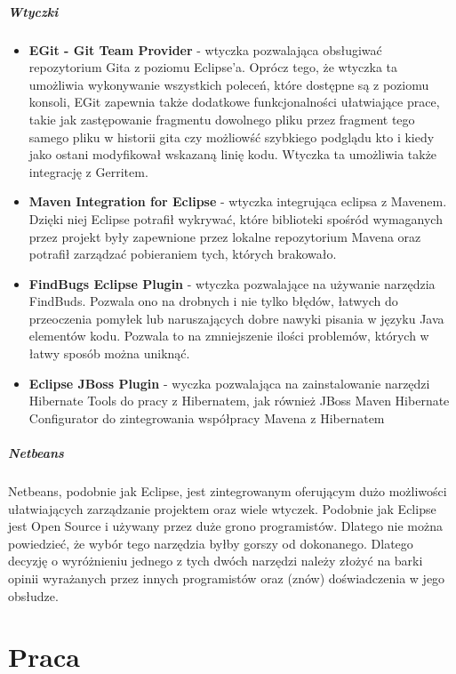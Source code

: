 \documentclass[licencjacka]{pracamgr}
\begin{document}
\paragraph{Wtyczki}
\begin{itemize}
\item \textbf{EGit - Git Team Provider} - wtyczka pozwalająca obsługiwać repozytorium Gita z poziomu Eclipse'a. Oprócz tego, że wtyczka ta umożliwia wykonywanie wszystkich poleceń, które dostępne są z poziomu konsoli, EGit zapewnia także dodatkowe funkcjonalności ułatwiające prace, takie jak zastępowanie fragmentu dowolnego pliku przez fragment tego samego pliku w historii gita czy możliowść szybkiego podglądu kto i kiedy jako ostani modyfikował wskazaną linię kodu. Wtyczka ta umożliwia także integrację z Gerritem.
\item \textbf{Maven Integration for Eclipse} - wtyczka integrująca eclipsa z Mavenem. Dzięki niej Eclipse potrafił wykrywać, które biblioteki spośród wymaganych przez projekt były zapewnione przez lokalne repozytorium Mavena oraz potrafił zarządzać pobieraniem tych, których brakowało.
\item \textbf{FindBugs Eclipse Plugin} - wtyczka pozwalające na używanie narzędzia FindBuds. Pozwala ono na drobnych i nie tylko błędów, łatwych do przeoczenia pomyłek lub naruszających dobre nawyki pisania w języku Java elementów kodu. Pozwala to na zmniejszenie ilości problemów, których w łatwy sposób można uniknąć.
\item \textbf{Eclipse JBoss Plugin} - wyczka pozwalająca na zainstalowanie narzędzi Hibernate Tools do pracy z Hibernatem, jak również JBoss Maven Hibernate Configurator do zintegrowania współpracy Mavena z Hibernatem
\end{itemize}

\paragraph{Netbeans}
Netbeans, podobnie jak Eclipse, jest zintegrowanym oferującym dużo możliwości ułatwiających zarządzanie projektem oraz wiele wtyczek. Podobnie jak Eclipse jest Open Source i używany przez duże grono programistów. Dlatego nie można powiedzieć, że wybór tego narzędzia byłby gorszy od dokonanego. Dlatego decyzję o wyróżnieniu jednego z tych dwóch narzędzi należy złożyć na barki opinii wyrażanych przez innych programistów oraz (znów) doświadczenia w jego obsłudze.


\chapter{Praca}
\end{document}
